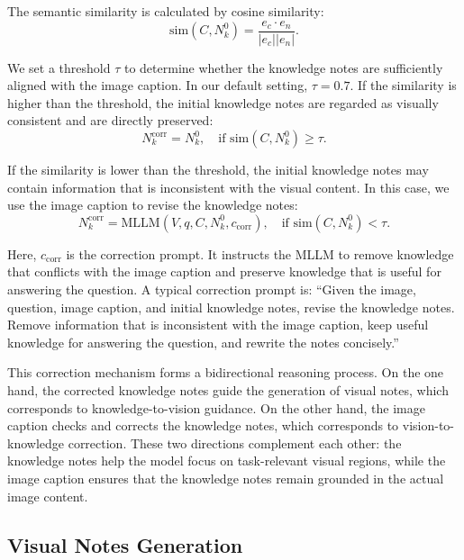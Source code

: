 \documentclass[manuscript,screen,review]{acmart}
\begin{document}
The semantic similarity is calculated by cosine similarity:
\begin{equation}
\text{sim}(C, N_k^{0}) = \frac{e_c \cdot e_n}{\lvert e_c \rvert \lvert e_n \rvert}.
\end{equation}

We set a threshold $\tau$ to determine whether the knowledge notes are sufficiently aligned with the image caption. In our default setting, $\tau = 0.7$. If the similarity is higher than the threshold, the initial knowledge notes are regarded as visually consistent and are directly preserved:
\begin{equation}
N_k^{\text{corr}} = N_k^{0}, \quad \text{if } \text{sim}(C, N_k^{0}) \geq \tau.
\end{equation}

If the similarity is lower than the threshold, the initial knowledge notes may contain information that is inconsistent with the visual content. In this case, we use the image caption to revise the knowledge notes:
\begin{equation}
N_k^{\text{corr}} = \text{MLLM}(V, q, C, N_k^{0}, c_{\text{corr}}), \quad \text{if } \text{sim}(C, N_k^{0}) < \tau.
\end{equation}

Here, $c_{\text{corr}}$ is the correction prompt. It instructs the MLLM to remove knowledge that conflicts with the image caption and preserve knowledge that is useful for answering the question. A typical correction prompt is: ``Given the image, question, image caption, and initial knowledge notes, revise the knowledge notes. Remove information that is inconsistent with the image caption, keep useful knowledge for answering the question, and rewrite the notes concisely.''

This correction mechanism forms a bidirectional reasoning process. On the one hand, the corrected knowledge notes guide the generation of visual notes, which corresponds to knowledge-to-vision guidance. On the other hand, the image caption checks and corrects the knowledge notes, which corresponds to vision-to-knowledge correction. These two directions complement each other: the knowledge notes help the model focus on task-relevant visual regions, while the image caption ensures that the knowledge notes remain grounded in the actual image content.

\subsection{Visual Notes Generation}
\end{document}
